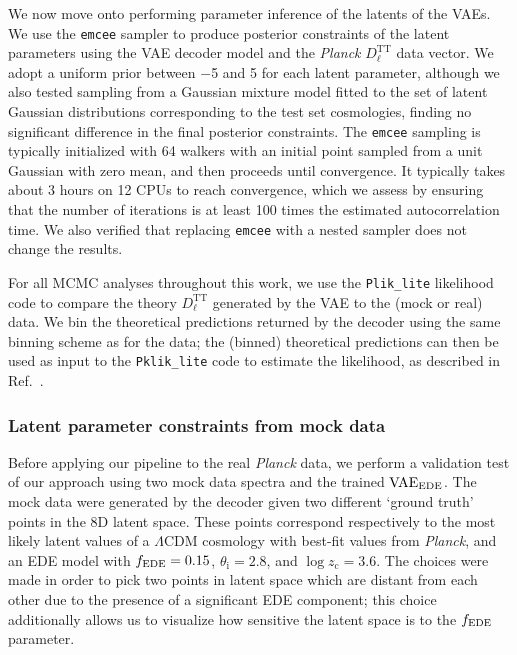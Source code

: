 \documentclass[aps, prd, reprint, superscriptaddress, nofootinbib, bibnotes]{revtex4-2}
\newcommand{\Planck}{\textit{Planck}}
\begin{document}
We now move onto performing parameter inference of the latents of the VAEs. We use the \texttt{emcee} sampler \cite{ForemanMackey13} to produce posterior constraints of the latent parameters using the VAE decoder model and the \Planck{} $D_{\ell}^{\mathrm{TT}}$ data vector. We adopt a uniform prior between $-$5 and 5 for each latent parameter, although we also tested sampling from a Gaussian mixture model fitted to the set of latent Gaussian distributions corresponding to the test set cosmologies, finding no significant difference in the final posterior constraints.
The \texttt{emcee} sampling is typically initialized with 64 walkers with an initial point sampled from a unit Gaussian with zero mean, and then proceeds until convergence. It typically takes about 3 hours on 12 CPUs to reach convergence, which we assess by ensuring that the number of iterations is at least 100 times the estimated autocorrelation time. We also verified that replacing \texttt{emcee} with a nested sampler does not change the results. 

For all MCMC analyses throughout this work, we use the \texttt{Plik\_lite} likelihood code to compare the theory $D_{\ell}^{\mathrm{TT}}$ generated by the VAE to the (mock or real) data. We bin the theoretical predictions returned by the decoder using the same binning scheme as for the data; the (binned) theoretical predictions can then be used as input to the \texttt{Pklik\_lite} code to estimate the likelihood, as described in Ref.~\cite{Planck:2019nip}. 

\subsubsection{Latent parameter constraints from mock data}

Before applying our pipeline to the real \Planck{} data, we perform a validation test of our approach using two mock data spectra and the trained $\rm{VAE}_{\rm{EDE}}$. The mock data were generated by the decoder given two different `ground truth' points in the 8D latent space. These points correspond respectively to the most likely latent values of a $\Lambda$CDM cosmology with best-fit values from \Planck{}, and an EDE model with $f_{\rm EDE}=0.15$, $\theta_\mathrm{i} = 2.8$, and $\log z_\mathrm{c} = 3.6$. The choices were made in order to pick two points in latent space which are distant from each other due to the presence of a significant EDE component; this choice additionally allows us to visualize how sensitive the latent space is to the $f_{\rm EDE}$ parameter. 
\end{document}
